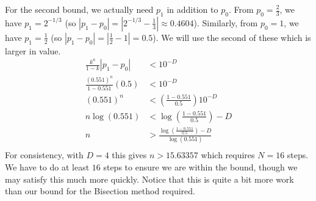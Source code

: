 \documentclass[11pt]{article}
\begin{document}
For the second bound, we actually need \(p_1\) in addition to \(p_0\).  From \(p_0 = \frac{2}{3}\), we have \(p_1 = 2^{-1/3}\) (so \(|p_1-p_0| = |2^{-1/3} - \frac{1}{3}| \approx 0.4604\)).  Similarly, from \(p_0=1\), we have \(p_1 = \frac{1}{2}\) (so \(|p_1-p_0| = |\frac{1}{2} - 1| = 0.5\)).  We will use the second of these which is larger in value.
\begin{align*}
\frac{k^n}{1-k}|p_1-p_0| & < 10^{-D}\\
\frac{(0.551)^n}{1-0.551}(0.5) & < 10^{-D}\\
(0.551)^n & < \left(\frac{1-0.551}{0.5}\right) 10^{-D}\\
n\log(0.551) & < \log\left(\frac{1-0.551}{0.5}\right) -D\\
n & > \frac{\log\left(\frac{1-0.551}{0.5}\right) -D}{\log(0.551)}\\
\end{align*}
For consistency, with \(D=4\) this gives \(n > 15.63357\) which requires \(N=16\) steps.  We have to do at least \(16\) steps to ensure we are within the bound, though we may satisfy this much more quickly. Notice that this is quite a bit more work than our bound for the Bisection method required.
\end{document}
